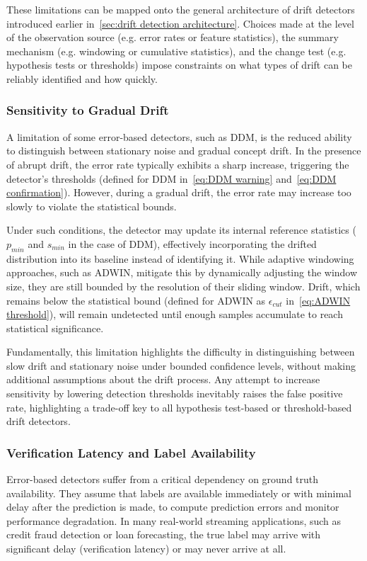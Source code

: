 These limitations can be mapped onto the general architecture of drift detectors introduced earlier in~\cref{sec:drift detection architecture}. Choices made at the level of the observation source (e.g. error rates or feature statistics), the summary mechanism (e.g. windowing or cumulative statistics), and the change test (e.g. hypothesis tests or thresholds) impose constraints on what types of drift can be reliably identified and how quickly.

\subsubsection{Sensitivity to Gradual Drift}
A limitation of some error-based detectors, such as DDM, is the reduced ability to distinguish between stationary noise and gradual concept drift. In the presence of abrupt drift, the error rate typically exhibits a sharp increase, triggering the detector's thresholds (defined for DDM in~\cref{eq:DDM warning} and~\cref{eq:DDM confirmation}). However, during a gradual drift, the error rate may increase too slowly to violate the statistical bounds.

Under such conditions, the detector may update its internal reference statistics ($p_{min}$ and $s_{min}$ in the case of DDM), effectively incorporating the drifted distribution into its baseline instead of identifying it. While adaptive windowing approaches, such as ADWIN, mitigate this by dynamically adjusting the window size, they are still bounded by the resolution of their sliding window. Drift, which remains below the statistical bound (defined for ADWIN as $\epsilon_{cut}$ in~\cref{eq:ADWIN threshold}), will remain undetected until enough samples accumulate to reach statistical significance.

Fundamentally, this limitation highlights the difficulty in distinguishing between slow drift and stationary noise under bounded confidence levels, without making additional assumptions about the drift process. Any attempt to increase sensitivity by lowering detection thresholds inevitably raises the false positive rate, highlighting a trade-off key to all hypothesis test-based or threshold-based drift detectors.

\subsubsection{Verification Latency and Label Availability}
Error-based detectors suffer from a critical dependency on ground truth availability. They assume that labels are available immediately or with minimal delay after the prediction is made, to compute prediction errors and monitor performance degradation. In many real-world streaming applications, such as credit fraud detection or loan forecasting, the true label may arrive with significant delay (verification latency) or may never arrive at all. 

